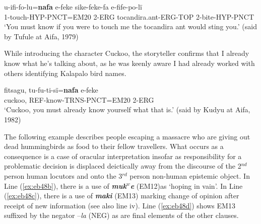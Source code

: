 \documentclass[output=paper]{langsci/langscibook}
\begin{document}
\begin{exe}
	\ex \label{ex:eb46}
	\gll u-ifi-fo-lu=\textbf{nafa} e-feke sike-feke-fa e-fife-po-lï\\
	1-touch-HYP-PNCT=EM20 2-ERG tocandira.ant-ERG-TOP 2-bite-HYP-PNCT\\
	\trans ‘You must know if you were to touch me  the tocandira ant would sting you.’ (said by Tufule at Aifa, 1979)
\end{exe}
 
While introducing the character Cuckoo, the storyteller confirms that I already know what he’s talking about, as he was keenly aware I had already worked with others identifying Kalapalo bird names.

\begin{exe}
	\ex \label{ex:eb47}
	\gll fitsagu, tu-fu-ti-sï=\textbf{nafa} e-feke\\
	cuckoo, REF-know-TRNS-PNCT=EM20 2-ERG\\
	\trans ‘Cuckoo, you must already know yourself what that is.’ (said by Kudyu at Aifa, 1982)
\end{exe}

The following example describes people escaping a massacre who are giving out dead hummingbirds as food to their fellow travellers. What occurs as a consequence is a case of oracular interpretation insofar as responsibility for a problematic decision is displaced deictically away from the discourse of the 2$^{nd}$ person human locutors and onto the 3$^{rd}$ person non-human epistemic object.  In Line (\ref{ex:eb48b}), there is a use of \textbf{\textit{muk$^w$e}}  (EM12)as ‘hoping in vain’. In Line (\ref{ex:eb48c}), there is a use of \textbf{\textit{maki}} (EM13) marking change of opinion after receipt of new information (see also line iv). Line (\ref{ex:eb48d}) shows EM13 suffixed by the negator –\textit{la} (NEG) %
as are final elements of the other clauses.  
\end{document}

